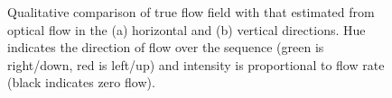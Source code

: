 \begin{figure}
\centering
{}
%
\caption{Qualitative comparison of true flow field with that estimated from optical flow in the (a) horizontal and (b) vertical directions. Hue indicates the direction of flow over the sequence (green is right/down, red is left/up) and intensity is proportional to flow rate (black indicates zero flow).}
\label{fig_flow_results_synth}
\end{figure}
